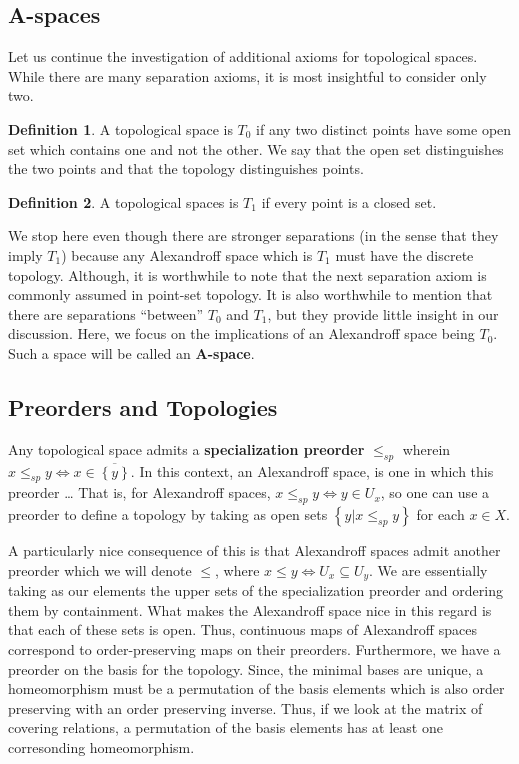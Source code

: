 \documentclass[paper=a4, fontsize=11pt]{scrartcl} %
\numberwithin{equation}{section} %
\numberwithin{figure}{section} %
\numberwithin{table}{section} %
\theoremstyle{definition}
\newtheorem{definition}{Definition}[section]
\theoremstyle{remark}
\begin{document}
\subsection{A-spaces}
Let us continue the investigation of additional axioms for topological spaces. While there are many separation axioms, it is most insightful to consider only two.
\begin{definition}
  A topological space is $T_0$ if any two distinct points have some open set which contains one and not the other. We say that the open set distinguishes the two points and that the topology distinguishes points.
\end{definition}
\begin{definition}
  A topological spaces is $T_1$ if every point is a closed set.
\end{definition}
We stop here even though there are stronger separations (in the sense that they imply $T_1$) because any Alexandroff space which is $T_1$ must have the discrete topology.
Although, it is worthwhile to note that the next separation axiom is commonly assumed in point-set topology.
It is also worthwhile to mention that there are separations ``between'' $T_0$ and $T_1$, but they provide little insight in our discussion.
Here, we focus on the implications of an Alexandroff space being $T_0$. Such a space will be called an \textbf{A-space}.

\subsection{Preorders and Topologies}

Any topological space admits a \textbf{specialization preorder} $\leq_{sp}$ wherein $x\leq_{sp} y \iff x\in \overline{\left\{ y \right\}}$.
In this context, an Alexandroff space, is one in which this preorder \dots
That is, for Alexandroff spaces, $x\leq_{sp} y \iff y\in U_x$, so one can use a preorder to define a topology by taking as open sets $\left\{ y|x\leq_{sp} y \right\}$ for each $x\in X$.

A particularly nice consequence of this is that Alexandroff spaces admit another preorder which we will denote $\leq$, where $x\leq y \iff U_x \subseteq U_y$. 
We are essentially taking as our elements the upper sets of the specialization preorder and ordering them by containment. 
What makes the Alexandroff space nice in this regard is that each of these sets is open.
Thus, continuous maps of Alexandroff spaces correspond to order-preserving maps on their preorders.
Furthermore, we have a preorder on the basis for the topology. 
Since, the minimal bases are unique, a homeomorphism must be a permutation of the basis elements which is also order preserving with an order preserving inverse.
Thus, if we look at the matrix of covering relations, a permutation of the basis elements has at least one corresonding homeomorphism.
\end{document}
